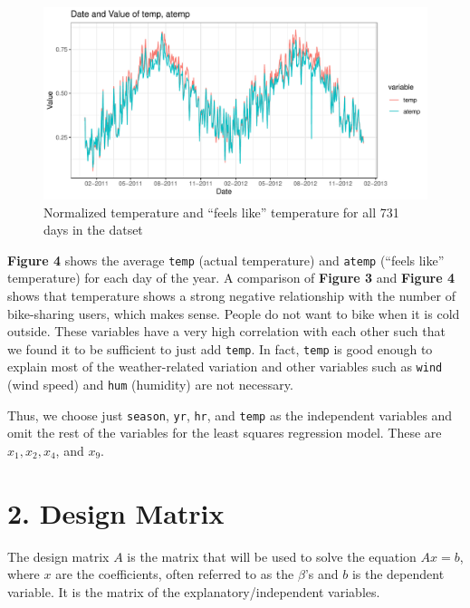 \documentclass[
]{article}
\begin{document}
\begin{figure}
\centering
\includegraphics{LeastSquares_files/figure-latex/unnamed-chunk-4-1.pdf}
\caption{Normalized temperature and ``feels like'' temperature for all
731 days in the datset}
\end{figure}

\textbf{Figure 4} shows the average \texttt{temp} (actual temperature)
and \texttt{atemp} (``feels like'' temperature) for each day of the
year. A comparison of \textbf{Figure 3} and \textbf{Figure 4} shows that
temperature shows a strong negative relationship with the number of
bike-sharing users, which makes sense. People do not want to bike when
it is cold outside. These variables have a very high correlation with
each other such that we found it to be sufficient to just add
\texttt{temp}. In fact, \texttt{temp} is good enough to explain most of
the weather-related variation and other variables such as \texttt{wind}
(wind speed) and \texttt{hum} (humidity) are not necessary.

Thus, we choose just \texttt{season}, \texttt{yr}, \texttt{hr}, and
\texttt{temp} as the independent variables and omit the rest of the
variables for the least squares regression model. These are
\(x_{1}, x_{2}, x_{4}\), and \(x_{9}\).

\newpage

\hypertarget{design-matrix}{%
\section{2. Design Matrix}\label{design-matrix}}

The design matrix \(A\) is the matrix that will be used to solve the
equation \(Ax = b\), where \(x\) are the coefficients, often referred to
as the \(\beta\)'s and \(b\) is the dependent variable. It is the matrix
of the explanatory/independent variables.
\end{document}
